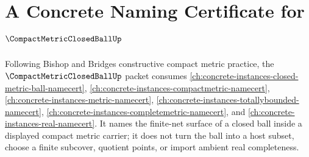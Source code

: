 \chapter{A Concrete Naming Certificate for $\CompactMetricClosedBallUp$}
\label{ch:concrete-instances-compact-metric-closed-ball-namecert}

Following Bishop and Bridges constructive compact metric practice, the $\CompactMetricClosedBallUp$ packet consumes \autoref{ch:concrete-instances-closed-metric-ball-namecert}, \autoref{ch:concrete-instances-compactmetric-namecert}, \autoref{ch:concrete-instances-metric-namecert}, \autoref{ch:concrete-instances-totallybounded-namecert}, \autoref{ch:concrete-instances-completemetric-namecert}, and \autoref{ch:concrete-instances-real-namecert}. It names the finite-net surface of a closed ball inside a displayed compact metric carrier; it does not turn the ball into a host subset, choose a finite subcover, quotient points, or import ambient real completeness.

